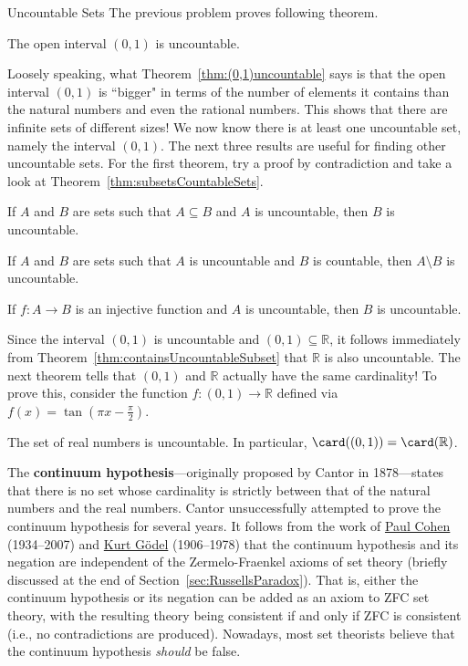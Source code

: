 \begin{section}{Uncountable Sets}
The previous problem proves following theorem.

\begin{theorem}\label{thm:(0,1)uncountable}
The open interval $(0,1)$ is uncountable.
\end{theorem}

Loosely speaking, what Theorem~\ref{thm:(0,1)uncountable} says is that the open interval $(0,1)$ is ``bigger" in terms of the number of elements it contains than the natural numbers and even the rational numbers.  This shows that there are infinite sets of different sizes! We now know there is at least one uncountable set, namely the interval $(0,1)$.  The next three results are useful for finding other uncountable sets. For the first theorem, try a proof by contradiction and take a look at Theorem~\ref{thm:subsetsCountableSets}.

\begin{theorem}\label{thm:containsUncountableSubset}
If $A$ and $B$ are sets such that $A\subseteq B$ and $A$ is uncountable, then $B$ is uncountable. 
\end{theorem}

\begin{corollary}
If $A$ and $B$ are sets such that $A$ is uncountable and $B$ is countable, then $A\setminus B$ is uncountable.
\end{corollary}

\begin{theorem}
If $f:A\to B$ is an injective function and $A$ is uncountable, then $B$ is uncountable.
\end{theorem}

Since the interval $(0,1)$ is uncountable and $(0,1)\subseteq \mathbb{R}$, it follows immediately from Theorem~\ref{thm:containsUncountableSubset} that $\mathbb{R}$ is also uncountable.  The next theorem tells that $(0,1)$ and $\mathbb{R}$ actually have the same cardinality! To prove this, consider the function $f:(0,1)\to \mathbb{R}$ defined via $f(x)=\tan(\pi x-\frac{\pi}{2})$.

\begin{theorem}\label{thm:R uncountable}
The set of real numbers is uncountable.  In particular, $\card((0,1))=\card(\mathbb{R})$.
\end{theorem}

The \textbf{continuum hypothesis}---originally proposed by Cantor in 1878---states that there is no set whose cardinality is strictly between that of the natural numbers and the real numbers. Cantor unsuccessfully attempted to prove the continuum hypothesis for several years. It follows from the work of \href{https://en.wikipedia.org/wiki/Paul_Cohen}{Paul Cohen} (1934--2007) and \href{https://en.wikipedia.org/wiki/Kurt_Godel}{Kurt G\"odel} (1906--1978) that the continuum hypothesis and its negation are independent of the Zermelo-Fraenkel axioms of set theory (briefly discussed at the end of Section~\ref{sec:RussellsParadox}). That is, either the continuum hypothesis or its negation can be added as an axiom to ZFC set theory, with the resulting theory being consistent if and only if ZFC is consistent (i.e., no contradictions are produced). Nowadays, most set theorists believe that the continuum hypothesis \emph{should} be false.


\end{section}
